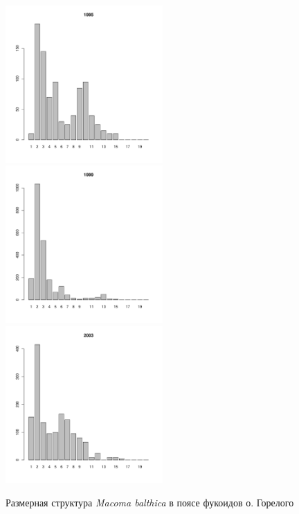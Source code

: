 \documentclass[12pt, a4paper]{article}
\begin{document}
\begin{figure}[h]
\begin{multicols}{3}
\hfill
\includegraphics[width=60mm]{../White_Sea/Luvenga_Goreliy/midlow_1995_.pdf}
\hfill
\includegraphics[width=60mm]{../White_Sea/Luvenga_Goreliy/midlow_1999_.pdf}
\hfill
\includegraphics[width=60mm]{../White_Sea/Luvenga_Goreliy/midlow_2003_.pdf}
\end{multicols}


\caption{Размерная структура {\it Macoma balthica} в поясе фукоидов о. Горелого}
\label{ris:size_str_Goreliy_midlow}
\end{figure}
\end{document}
